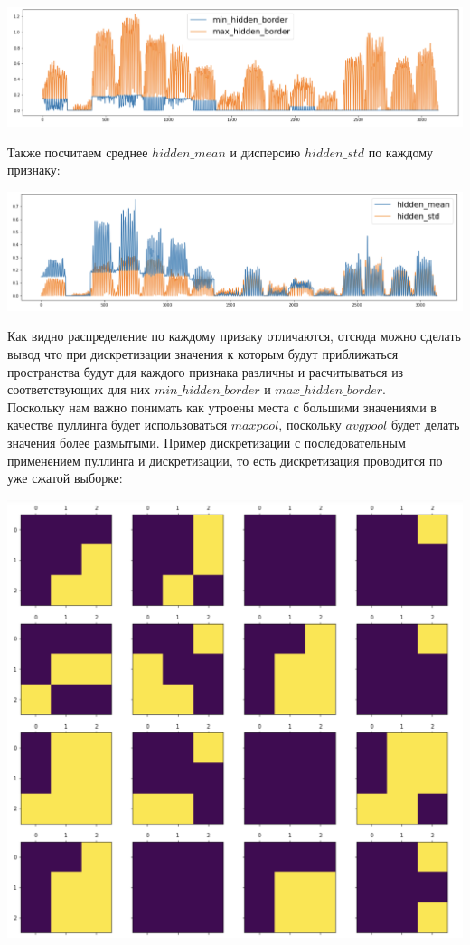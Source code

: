 \begin{center}
    \includegraphics[scale=0.5]{images/z1_borders.png}
\end{center}
Также посчитаем среднее $hidden\_mean$ и дисперсию $hidden\_std$ по каждому признаку:
\begin{center}
    \includegraphics[scale=0.5]{images/z1_means.png}
\end{center}
Как видно распределение по каждому призаку отличаются, отсюда можно сделать вывод что при дискретизации значения к которым будут приближаться пространства будут для каждого признака различны и расчитываться из соответствующих для них $min\_hidden\_border$ и $max\_hidden\_border$. \\
Поскольку нам важно понимать как утроены места с большими значениями в качестве пуллинга будет использоваться $maxpool$, поскольку $avgpool$ будет делать значения более размытыми. Пример дискретизации с последовательным применением пуллинга и дискретизации, то есть дискретизация проводится по уже сжатой выборке:
\begin{center}
    \includegraphics[scale=0.5]{images/z1_max_7.png}
\end{center}\
